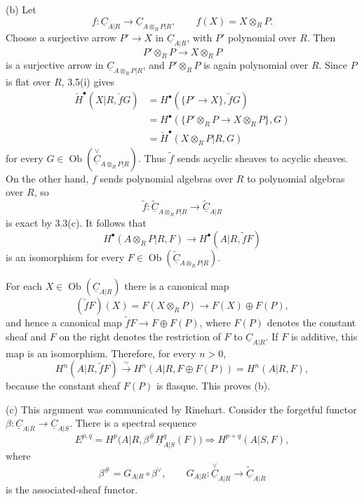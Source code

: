 (b) Let
\[
 f:\underline C_{A|R}\longrightarrow
 \underline C_{A\otimes_RP|R},
 \qquad f(X)=X\otimes_RP.
\]
Choose a surjective arrow $P'\longrightarrow X$ in
$\underline C_{A|R}$, with $P'$ polynomial over $R$. Then
\[
 P'\otimes_RP\longrightarrow X\otimes_RP
\]
is a surjective arrow in $\underline C_{A\otimes_RP|R}$, and
$P'\otimes_RP$ is again polynomial over $R$. Since $P$ is flat
over $R$, 3.5(i) gives
\begin{align*}
 \check H^{\bullet}(X|R,\check fG)
 &=H^{\bullet}(\{P'\longrightarrow X\},\check fG)\\
 &=H^{\bullet}(\{P'\otimes_RP\longrightarrow X\otimes_RP\},G)\\
 &=\check H^{\bullet}(X\otimes_RP|R,G)
\end{align*}
for every
$G\in\operatorname{Ob}(\overset{\vee}{\underline C}_{A\otimes_RP|R})$.
Thus $\widetilde f$ sends acyclic sheaves to acyclic sheaves. On
the other hand, $f$ sends polynomial algebras over $R$ to
polynomial algebras over $R$, so
\[
 \widetilde f:\widetilde{\underline C}_{A\otimes_RP|R}
 \longrightarrow\widetilde{\underline C}_{A|R}
\]
is exact by 3.3(c). It follows that
\[
 H^{\bullet}(A\otimes_RP|R,F)
 \longrightarrow H^{\bullet}(A|R,\widetilde fF)
\]
is an isomorphism for every
$F\in\operatorname{Ob}(\widetilde{\underline C}_{A\otimes_RP|R})$.

For each $X\in\operatorname{Ob}(\underline C_{A|R})$ there is a
canonical map
\[
 (\widetilde fF)(X)=F(X\otimes_RP)
 \longrightarrow F(X)\oplus F(P),
\]
and hence a canonical map
$\widetilde fF\longrightarrow F\oplus F(P)$, where $F(P)$ denotes
the constant sheaf and $F$ on the right denotes the restriction of
$F$ to $\underline C_{A|R}$. If $F$ is additive, this map is an
isomorphism. Therefore, for every $n>0$,
\[
 H^n(A|R,\widetilde fF)
 \xrightarrow{\ \sim\ }
 H^n(A|R,F\oplus F(P))=H^n(A|R,F),
\]
because the constant sheaf $F(P)$ is flasque. This proves (b).


(c) This argument was communicated by Rinehart. Consider the
forgetful functor
$\beta:\underline C_{A|R}\longrightarrow\underline C_{A|S}$.
There is a spectral sequence
\[
 E^{p,q}=H^p\bigl(A|R,
 \beta^{\#}\underline H^q_{A|S}(F)\bigr)
 \Longrightarrow H^{p+q}(A|S,F),
\]
where
\[
 \beta^{\#}=G_{A|R}\circ\beta^{\vee},
 \qquad
 G_{A|R}:\overset{\vee}{\underline C}_{A|R}
 \longrightarrow\widetilde{\underline C}_{A|R}
\]
is the associated-sheaf functor.

